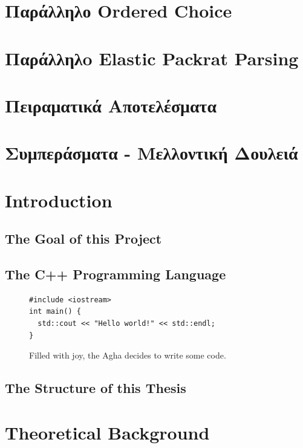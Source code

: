 \documentclass[diploma]{softlab-thesis}
\begin{document}
\chapter{ Παράλληλο Ordered Choice }

\chapter{ Παράλληλo Elastic Packrat Parsing }

\chapter{  Πειραματικά Αποτελέσματα }

\chapter{ Συμπεράσματα - Μελλοντική Δουλειά }

\englishtext

\chapter{Introduction}

\section{The Goal of this Project}

\section{The C++ Programming Language}


\begin{figure}[t]
\setlength\partopsep{-\topsep}%
\begin{verbatim}
#include <iostream>
int main() {
  std::cout << "Hello world!" << std::endl;
}
\end{verbatim}
\caption{Filled with joy, the Agha decides to write some code.%
  \label{fig:hello-english}}
\end{figure}


\section{The Structure of this Thesis}

\chapter{Theoretical Background}
\end{document}

